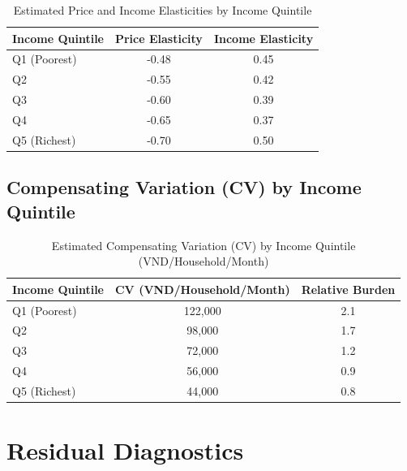 \documentclass[12pt,a4paper]{article}
\begin{document}
	\begin{table}[H]
		\centering
		\caption{Estimated Price and Income Elasticities by Income Quintile}
		\label{tab:elasticity_quintile}
		\begin{tabular}{lcc}
			\toprule
			Income Quintile & Price Elasticity & Income Elasticity \\
			\midrule
			Q1 (Poorest)    & -0.48 & 0.45 \\
			Q2              & -0.55 & 0.42 \\
			Q3              & -0.60 & 0.39 \\
			Q4              & -0.65 & 0.37 \\
			Q5 (Richest)    & -0.70 & 0.50 \\
			\bottomrule
		\end{tabular}
	\end{table}
	
	\subsection{Compensating Variation (CV) by Income Quintile}
	
	\begin{table}[H]
		\centering
		\caption{Estimated Compensating Variation (CV) by Income Quintile (VND/Household/Month)}
		\label{tab:cv_quintile}
		\begin{tabular}{lcc}
			\toprule
			Income Quintile & CV (VND/Household/Month) & Relative Burden \\
			\midrule
			Q1 (Poorest)    & 122,000 & 2.1 \\
			Q2              & 98,000  & 1.7 \\
			Q3              & 72,000  & 1.2 \\
			Q4              & 56,000  & 0.9 \\
			Q5 (Richest)    & 44,000  & 0.8 \\
			\bottomrule
		\end{tabular}
	\end{table}
	
	\section{Residual Diagnostics}
	
\end{document}
